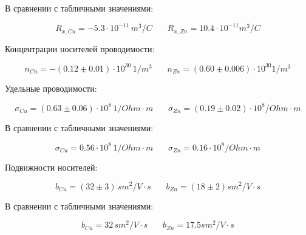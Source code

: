 \documentclass[12pt,a4paper]{scrartcl}
\begin{document}
	В сравнении с табличными значениями:
	
	$$R_{x, Cu} = -5.3 \cdot 10^{-11}\, m^3/C\ \ \ \ \ \ \ \ R_{x, Zn} = 10.4 \cdot 10^{-11} m^3/C$$
	
	Концентрации носителей проводимости:
		
	$$n_{Cu} = -(0.12 \pm 0.01) \cdot 10^{30}\, 1/m^3\ \ \ \ \ \ \ \ n_{Zn} = (0.60 \pm 0.006) \cdot 10^{30} 1/m^3$$
	
	Удельные проводимости:
	
		$$\sigma_{Cu} = (0.63 \pm 0.06) \cdot 10^{8}\, 1/Ohm \cdot m\ \ \ \ \ \ \ \ \sigma_{Zn} = (0.19 \pm 0.02) \cdot 10^{8} /Ohm \cdot m$$	
	
	В сравнении с табличными значениями:
	
	$$\sigma_{Cu} = 0.56 \cdot 10^{8}\, 1/Ohm \cdot m\ \ \ \ \ \ \ \ \sigma_{Zn} = 0.16 \cdot 10^{8} /Ohm \cdot m$$	
	
	Подвижности носителей:
	
	$$b_{Cu} = (32 \pm 3) \, sm^2/V \cdot s\ \ \ \ \ \ \ \ b_{Zn} = (18 \pm 2) sm^2/V \cdot s$$
	
	В сравнении с табличными значениями:

	$$b_{Cu} = 32 \, sm^2/V \cdot s\ \ \ \ \ \ \ \ b_{Zn} = 17.5 sm^2/V \cdot s$$
\end{document}
